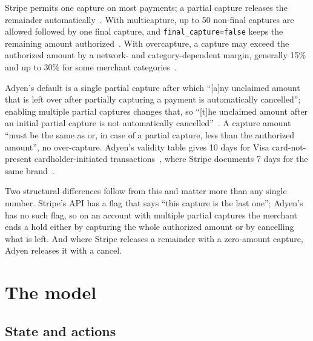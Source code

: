 \documentclass[conference]{IEEEtran}
\newcommand{\code}[1]{\texttt{\small #1}}
\begin{document}
Stripe permits one capture on most payments; a partial capture releases the
remainder automatically~\cite{stripe2026hold}. With multicapture, up to 50
non-final captures are allowed followed by one final capture, and
\code{final\_capture=false} keeps the remaining amount
authorized~\cite{stripe2026multicapture}. With overcapture, a capture may exceed
the authorized amount by a network- and category-dependent margin, generally
15\% and up to 30\% for some merchant categories~\cite{stripe2026overcapture}.

Adyen's default is a single partial capture after which ``[a]ny unclaimed amount
that is left over after partially capturing a payment is automatically
cancelled''; enabling multiple partial captures changes that, so ``[t]he
unclaimed amount after an initial partial capture is not automatically
cancelled''~\cite{adyen2026capture}. A capture amount ``must be the same as or,
in case of a partial capture, less than the authorized amount'', no
over-capture. Adyen's validity table gives 10 days for Visa card-not-present
cardholder-initiated transactions~\cite{adyen2026adjust}, where Stripe documents
7 days for the same brand~\cite{stripe2026hold}.

Two structural differences follow from this and matter more than any single
number. Stripe's API has a flag that says ``this capture is the last one'';
Adyen's has no such flag, so on an account with multiple partial captures the
merchant ends a hold either by capturing the whole authorized amount or by
cancelling what is left. And where Stripe releases a remainder with a zero-amount
capture, Adyen releases it with a cancel.

\begin{table}[t]
\centering
\caption{Provider profiles, from published documentation (accessed 1 September
2026). The synthetic profile exercises incremental authorization, which neither
provider's documented default includes.}
\label{tab:profiles}
\small

\end{table}

\section{The model}
\label{sec:model}

\subsection{State and actions}
\end{document}
